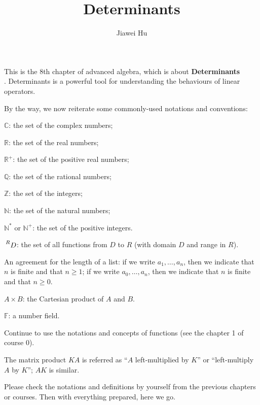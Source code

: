 \documentclass{article}
\title{\LARGE \textbf{Determinants}}
\author{\large Jiawei Hu}
\begin{document}
\maketitle

This is the 8th chapter of advanced algebra, which is about \textbf{Determinants}\\. Determinants is a powerful tool for understanding the behaviours of linear operators.
 

By the way, we now reiterate some commonly-used notations and conventions:
\begin{compactenum}
    \item $\mathbb{C}$: the set of the complex numbers;
    \item $\mathbb{R}$: the set of the real numbers;
    \item $\mathbb{R}^+$: the set of the positive real numbers;
    \item $\mathbb{Q}$: the set of the rational numbers;
    \item $\mathbb{Z}$: the set of the integers;
    \item $\mathbb{N}$: the set of the natural numbers;
    \item $\mathbb{N^\ast}$ or $\mathbb{N}^+$: the set of the positive integers.
    \item $\sideset{^R}{}{\mathop{D}}$: the set of all functions from $D$ to $R$ (with domain $D$ and range in $R$).
    \item An agreement for the length of a list: if we write $a_1, \dots, a_n$, then we indicate that $n$ is finite and that $n\geq 1$; if we write $a_0, \dots, a_n$, then we indicate that $n$ is finite and that $n\geq 0$.
    \item $A\times B$: the Cartesian product of $A$ and $B$.
    \item $\mathbb{F}$: a number field.
    \item Continue to use the notations and concepts of functions (see the chapter 1 of course 0).
    \item The matrix product $KA$ is referred as ``$A$ left-multiplied by $K$'' or ``left-multiply $A$ by $K$''; $AK$ is similar.
\end{compactenum} 
Please check the notations and definitions by yourself from the previous chapters or courses. Then with everything prepared, here we go.
\end{document}
